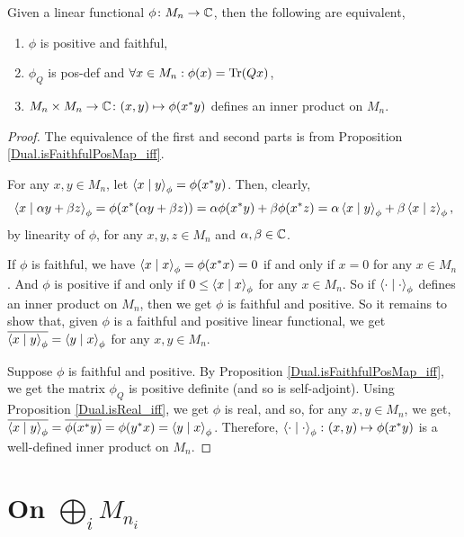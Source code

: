   \begin{theorem}\label{Dual.isFaithfulPosMap_tfae}
   \leanok
   Given a linear functional $\phi\colon{M_n}\to\mathbb{C}$, then the following are equivalent,
   \begin{enumerate}[label=(\roman*)]
    \item $\phi$ is positive and faithful,
    \item $\phi_Q$ is pos-def and $\forall{x}\in{M_n}:\phi(x)=\operatorname{Tr}(Qx)$,
    \item $M_n\times{M_n}\to\mathbb{C}\colon(x,y)\mapsto\phi(x^*y)$ defines an inner product on $M_n$.
   \end{enumerate}
  \end{theorem}
  \begin{proof}\leanok
   The equivalence of the first and second parts is from Proposition \ref{Dual.isFaithfulPosMap_iff}.
   
   For any $x,y\in{M_n}$, let $\left\langle x \mid y\right\rangle_\phi=\phi(x^*y)$.
   Then, clearly,
   \[\left\langle x \mid \alpha{y}+\beta{z}\right\rangle_\phi=\phi(x^*(\alpha{y}+\beta{z}))=\alpha\phi(x^*y)+\beta\phi(x^*z)=\alpha\left\langle x \mid y\right\rangle_\phi+\beta\left\langle x \mid z\right\rangle_\phi,\]
   by linearity of $\phi$, for any $x,y,z\in{M_n}$ and $\alpha,\beta\in\mathbb{C}$.
   
   If $\phi$ is faithful, we have $\left\langle x \mid x\right\rangle_\phi=\phi(x^*x)=0$ if and only if $x=0$ for any $x\in{M_n}$.
   And $\phi$ is positive if and only if $0\leq\left\langle x \mid x\right\rangle_\phi$ for any $x\in{M_n}$. So if $\left\langle\cdot \mid \cdot\right\rangle_\phi$ defines an inner product on $M_n$, then we get $\phi$ is faithful and positive. So it remains to show that, given $\phi$ is a faithful and positive linear functional, we get $\overline{\left\langle x \mid y\right\rangle_\phi}=\left\langle y \mid x\right\rangle_\phi$ for any $x,y\in{M_n}$.
     
   Suppose $\phi$ is faithful and positive. By Proposition \ref{Dual.isFaithfulPosMap_iff}, we get the matrix $\phi_Q$ is positive definite (and so is self-adjoint). Using Proposition \ref{Dual.isReal_iff}, we get $\phi$ is real, and so, for any $x,y\in{M_n}$, we get, $\overline{\left\langle x \mid y\right\rangle_\phi}=\overline{\phi(x^*y)}=\phi(y^*x)=\left\langle y \mid x\right\rangle_\phi$.
   Therefore, $\left\langle\cdot \mid \cdot\right\rangle_\phi\colon(x,y)\mapsto\phi(x^*y)$ is a well-defined inner product on $M_n$.
  \end{proof}

\section{On $\bigoplus_iM_{n_i}$}

